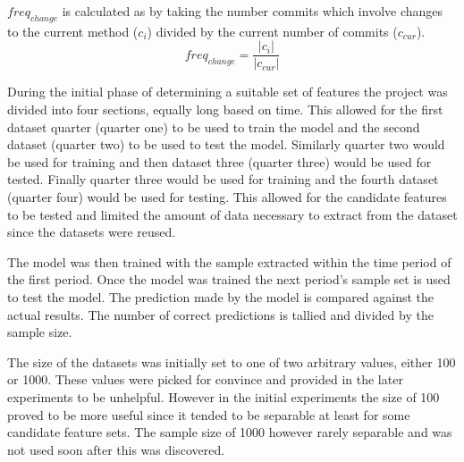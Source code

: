 $freq_{change}$ is calculated as by taking the number commits which involve changes to the current method ($c_i$) divided by the current number of commits ($c_{cur}$).
\begin{equation}
\label{eq:freq_change}
freq_{change} = \frac{|c_i|}{|c_{cur}|}
\end{equation}



During the initial phase of determining a suitable set of features the project was divided into four sections, equally long based on time. This allowed for the first dataset quarter (quarter one) to be used to train the model and the second dataset (quarter two) to be used to test the model. Similarly quarter two would be used for training and then dataset three (quarter three) would be used for tested. Finally quarter three would be used for training and the fourth dataset (quarter four) would be used for testing. This allowed for the candidate features to be tested and limited the amount of data necessary to extract from the dataset since the datasets were reused.

The model was then trained with the sample extracted within the time period of the first period. Once the model was trained the next period's sample set is used to test the model. The prediction made by the model is compared against the actual results. The number of correct predictions is tallied and divided by the sample size. 


The size of the datasets was initially set to one of two arbitrary values, either 100 or 1000. These values were picked for convince and provided in the later experiments to be unhelpful. However in the initial experiments the size of 100 proved to be more useful since it tended to be separable at least for some candidate feature sets. The sample size of 1000 however rarely separable and was not used soon after this was discovered. 


